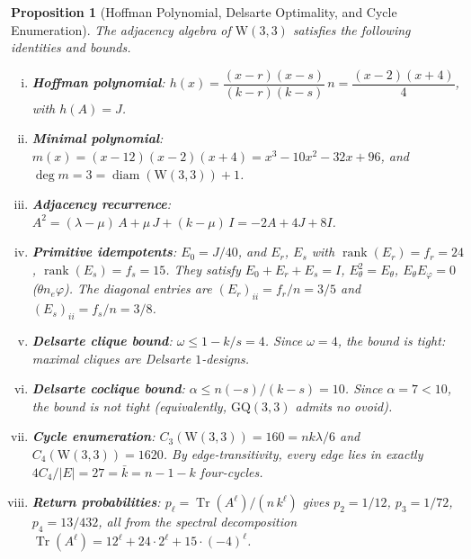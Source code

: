 \documentclass[12pt,a4paper]{article}
\newtheorem{proposition}[theorem]{Proposition}
\newcommand{\W}{\mathrm{W}(3,3)}
\renewcommand{\ne}{n_{\!e}}
\begin{document}
\begin{proposition}[Hoffman Polynomial, Delsarte Optimality, and Cycle
Enumeration]\label{prop:hoffman}
The adjacency algebra of $\W$ satisfies the following identities and bounds.
\begin{enumerate}[(i)]
  \item \textbf{Hoffman polynomial}:
        $h(x) = \dfrac{(x - r)(x - s)}{(k - r)(k - s)}\,n
              = \dfrac{(x-2)(x+4)}{4}$,
        with $h(A) = J$.
  \item \textbf{Minimal polynomial}:
        $m(x) = (x-12)(x-2)(x+4) = x^3 - 10x^2 - 32x + 96$,
        and $\deg m = 3 = \operatorname{diam}(\W) + 1$.
  \item \textbf{Adjacency recurrence}:
        $A^2 = (\lambda{-}\mu)\,A + \mu\,J + (k{-}\mu)\,I
             = -2A + 4J + 8I$.
  \item \textbf{Primitive idempotents}:
        $E_0 = J/40$, and $E_r$, $E_s$ with
        $\operatorname{rank}(E_r) = f_r = 24$,
        $\operatorname{rank}(E_s) = f_s = 15$.
        They satisfy $E_0 + E_r + E_s = I$, $E_\theta^2 = E_\theta$,
        $E_\theta E_\varphi = 0$ ($\theta \ne \varphi$).
        The diagonal entries are
        $(E_r)_{ii} = f_r/n = 3/5$ and $(E_s)_{ii} = f_s/n = 3/8$.
  \item \textbf{Delsarte clique bound}:
        $\omega \le 1 - k/s = 4$.
        Since $\omega = 4$, the bound is \emph{tight}: maximal cliques are
        Delsarte $1$-designs.
  \item \textbf{Delsarte coclique bound}:
        $\alpha \le n(-s)/(k{-}s) = 10$.
        Since $\alpha = 7 < 10$, the bound is \emph{not tight}
        (equivalently, $\mathrm{GQ}(3,3)$ admits no ovoid).
  \item \textbf{Cycle enumeration}:
        $C_3(\W) = 160 = nk\lambda/6$ and
        $C_4(\W) = 1620$.
        By edge-transitivity, every edge lies in exactly
        $4 C_4 / |E| = 27 = \bar k = n{-}1{-}k$ four-cycles.
  \item \textbf{Return probabilities}:
        $p_\ell = \operatorname{Tr}(A^\ell)/(n\,k^\ell)$
        gives $p_2 = 1/12$, $p_3 = 1/72$, $p_4 = 13/432$,
        all from the spectral decomposition
        $\operatorname{Tr}(A^\ell)
        = 12^\ell + 24\cdot 2^\ell + 15\cdot(-4)^\ell$.
\end{enumerate}
\end{proposition}
\end{document}
